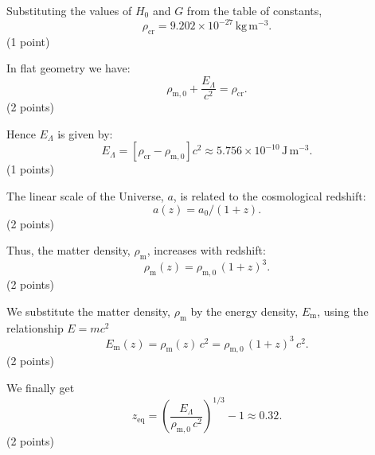 Substituting the values of $H_0$ and $G$ from the table of constants,
\[ \rho_{\mathrm{cr}} = 9.202\times 10^{-27}\,\mathrm{kg\,m^{-3}}. \]
\hfill(1 point)

In flat geometry we have:
\[ \rho_{\mathrm{m},0} + \frac{E_\Lambda}{c^2} = \rho_{\mathrm{cr}}. \]
\hfill(2 points)

Hence $E_\Lambda$ is given by:
\[ E_\Lambda = \left[\rho_{\mathrm{cr}} - \rho_{\mathrm{m},0}\right]c^2
   \approx 5.756\times 10^{-10}\,\mathrm{J\,m^{-3}}. \]
\hfill(1 points)

The linear scale of the Universe, $a$, is related to the cosmological
redshift:
\[ a(z) = a_0/(1 + z). \]
\hfill(2 points)

Thus, the matter density, $\rho_{\mathrm{m}}$, increases with redshift:
\[ \rho_{\mathrm{m}}(z) = \rho_{\mathrm{m},0}\,(1 + z)^3. \]
\hfill(2 points)

We substitute the matter density, $\rho_{\mathrm{m}}$ by the energy
density, $E_{\mathrm{m}}$, using the relationship $E = mc^2$
\[ E_{\mathrm{m}}(z) = \rho_{\mathrm{m}}(z)\,c^2
   = \rho_{\mathrm{m},0}\,(1 + z)^3\,c^2. \]
\hfill(2 points)

We finally get
\[ z_{\mathrm{eq}} = \left(\frac{E_\Lambda}{\rho_{\mathrm{m},0}\,c^2}\right)^{1/3} - 1
   \approx 0.32. \]
\hfill(2 points)

